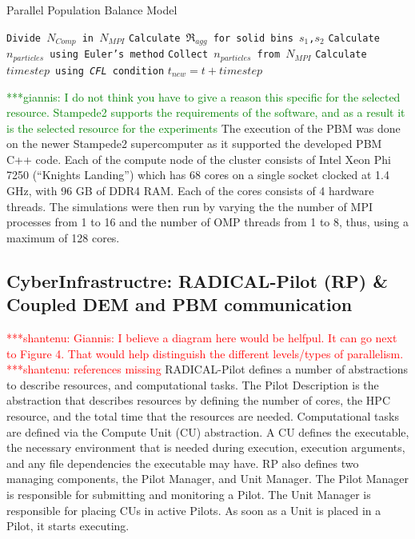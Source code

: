 \documentclass[preprint,11pt,authoryear]{elsarticle}
\newcommand{\jhanote}[1]{ {\textcolor{red} { ***shantenu: #1 }}}
\newcommand{\gpnote}[1]{{\textcolor{green} {***giannis: #1}}}
\newcommand{\jhanote}[1]{ {\textcolor{red} { ***shantenu: #1 }}}
\newcommand{\gpnote}[1]{}
\begin{document}
\begin{algorithm}
     \scriptsize
     \caption{Parallel Population Balance Model}
     \label{alg:parallelPBM}
     \begin{algorithmic}[1]
     \State \texttt{Divide $N_{Comp}$ in $N_{MPI}$}
     \State \texttt{Calculate $\Re_{agg}$ for solid bins $s_1$,$s_2$}
     \EndFor 
     \State \texttt{Calculate $n_{particles}$ using Euler's method}
     \EndFor
     \State \texttt{Collect $n_{particles}$ from $N_{MPI}$}
     \State \texttt{Calculate $timestep$ using \textit{CFL} condition}
     \State \texttt{$t_{new} = t + timestep$ }
     \EndWhile
     \EndProcedure
     \end{algorithmic}
 \label{alg:parpbm}
 \end{algorithm}     


\gpnote{I do not think you have to
give a reason this specific for the selected resource. Stampede2 supports the requirements of the
software, and as a result it is the selected resource for the experiments}
The execution of the PBM was done on the
newer Stampede2 supercomputer as it supported the developed PBM C++ code. 
Each of the compute node of the cluster
consists of Intel Xeon Phi 7250 (\textquotedblleft Knights
Landing\textquotedblright) which has 68 cores on a single socket clocked at
1.4 GHz, with 96 GB of DDR4 RAM. Each of the cores consists of 4 hardware
threads. The simulations were then run by varying the the number of MPI
processes from 1 to 16 and the number of OMP threads from 1 to 8, thus, using
a maximum of 128 cores.

\subsection{CyberInfrastructre: RADICAL-Pilot (RP) \& Coupled DEM and PBM communication}
\label{sec:RPandCommunications}

\jhanote{Giannis: I believe a diagram here would be helfpul. It can go next to Figure 4. That would help distinguish the different levels/types of parallelism.}\jhanote{references missing}
RADICAL-Pilot defines a number of abstractions to describe resources, and
computational tasks. The Pilot Description is the abstraction that describes
resources by defining the number of cores, the HPC resource, and the total time that 
the resources are needed. Computational tasks are defined via the Compute Unit 
(CU) abstraction. A CU defines the executable, the necessary
environment that is needed during execution, execution arguments, and any file
dependencies the executable may have. RP also defines two managing components,
the Pilot Manager, and Unit Manager. The Pilot Manager is responsible for
submitting and monitoring a Pilot. The Unit Manager is responsible for
placing CUs in active Pilots. As soon as a Unit is placed in a Pilot, it starts
executing.
\end{document}
